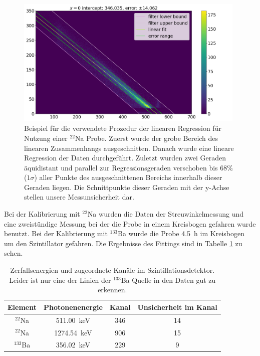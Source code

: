 \begin{figure}[ht]
	\centering
    \includegraphics[width=0.98\textwidth]{images/kali_szint_fit_Na22.png}
	\caption{Beispiel für die verwendete Prozedur der linearen Regression für Nutzung einer $^{22}$Na Probe. Zuerst wurde der grobe Bereich des linearen Zusammenhangs ausgeschnitten. Danach wurde eine lineare Regression der Daten durchgeführt. Zuletzt wurden zwei Geraden äquidistant und parallel zur Regressionsgeraden verschoben bis $ 68 \% $ ($1 \sigma$) aller Punkte des ausgeschnittenen Bereichs innerhalb dieser Geraden liegen. Die Schnittpunkte dieser Geraden mit der y-Achse stellen unsere Messunsicherheit dar.}
	\label{kali_szint_bsp_fit}
\end{figure}

Bei der Kalibrierung mit $^{22}$Na wurden die Daten der Streuwinkelmessung und eine zweistündige Messung bei der die Probe in einem Kreisbogen gefahren wurde benutzt. Bei der Kalibrierung mit $^{133}$Ba wurde die Probe \SI{4.5}{\hour} im Kreisbogen um den Szintillator gefahren. Die Ergebnisse des Fittings sind in Tabelle \ref{kali_szint_Energien} zu sehen.

\begin{table}[h]
    \centering
    \begin{tabular}{|c | c | c | c|}
        \hline
        Element & Photonenenergie & Kanal & Unsicherheit im Kanal \\
        \hline
        $^{22}$Na & \SI{511.00}{\kilo\electronvolt} & 346 & 14 \\
        $^{22}$Na & \SI{1274.54}{\kilo\electronvolt} & 906 & 15 \\
        $^{133}$Ba & \SI{356.02}{\kilo\electronvolt} & 229 & 9 \\
        \hline
    \end{tabular}
    \caption{Zerfallsenergien und zugeordnete Kanäle im Szintillationsdetektor. Leider ist nur eine der Linien der $^{133}$Ba Quelle in den Daten gut zu erkennen.}
    \label{kali_szint_Energien}
\end{table}

